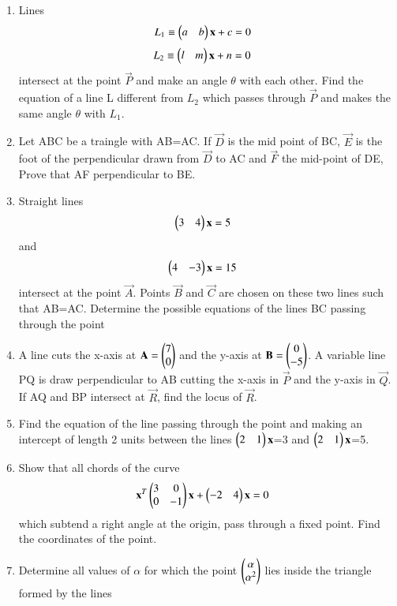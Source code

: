 \begin{enumerate}[label=\arabic*.,ref=\thesubsection.\theenumi]
    \item Lines \begin{align}L_1\equiv\begin{pmatrix}a & b\end{pmatrix} \mathbf {x} + c &= 0 \end{align} \begin{align}L_2\equiv\begin{pmatrix}l & m\end{pmatrix} \mathbf {x} + n &= 0 \end{align} intersect at the point $\vec{P}$ and make an angle $\theta$ with each other. Find the equation of a line L different from $L_2$ which passes through $\vec{P}$ and makes the same angle $\theta$ with $L_1$.
    \item Let ABC be a traingle with AB=AC. If $\vec{D}$ is the mid point of BC, $\vec{E}$ is the foot of the perpendicular drawn from $\vec{D}$ to AC and $\vec{F}$ the mid-point of DE, Prove that AF perpendicular to BE.
    \item Straight lines\begin{align}\begin{pmatrix}3 & 4\end{pmatrix} \mathbf {x}  &= 5 \end{align} and \begin{align}\begin{pmatrix}4 & -3\end{pmatrix} \mathbf {x}  &= 15 \end{align} intersect at the point $\vec{A}$. Points $\vec{B}$ and $\vec{C}$ are chosen on these two lines such that AB=AC. Determine the possible equations of the lines BC passing through the point
    \item A line cuts the x-axis at $\mathbf{A}= \begin{pmatrix}7\\0\end{pmatrix}$ and the y-axis at $\mathbf{B}=\begin{pmatrix}0\\-5\end{pmatrix}$. A variable line PQ is draw perpendicular to AB cutting the x-axis in $\vec{P}$ and the y-axis in $\vec{Q}$. If AQ and BP intersect at $\vec{R}$, find the locus of $\vec{R}$.
    \item Find the equation of the line passing through the point  and making an intercept of  length 2 units between the lines $\begin{pmatrix}2 & 1\end{pmatrix}\mathbf {x}$=3 and $\begin{pmatrix}2 & 1\end{pmatrix} \mathbf {x}$=5.
    \item Show that all chords of the curve  \begin{align}\mathbf{x}^T\begin{pmatrix}3 & 0 \\ 0 & -1\end{pmatrix} \mathbf {x} + \begin{pmatrix}-2 & 4\end{pmatrix} \mathbf {x} &= 0 \end{align} which subtend a right angle at the origin, pass through a fixed point. Find the coordinates of the point.
    \item Determine all values of $\alpha$ for which the point $\begin{pmatrix}\alpha\\ \alpha^2\end{pmatrix}$ lies inside the triangle formed by the lines 

\end{enumerate}
